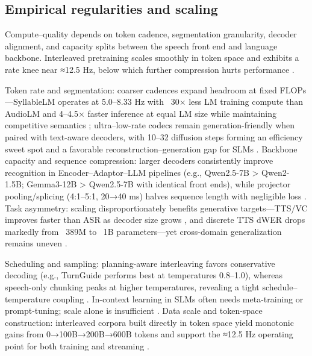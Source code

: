 \subsection{Empirical regularities and scaling} \label{subsec:Empirical regularities and scaling}
Compute–quality depends on token cadence, segmentation granularity, decoder alignment, and capacity splits between the speech front end and language backbone. Interleaved pretraining scales smoothly in token space and exhibits a rate knee near ≈12.5 Hz, below which further compression hurts performance \cite{zeng2024scalingspeechtextpretrainingsyntheticint}.

Token rate and segmentation: coarser cadences expand headroom at fixed FLOPs—SyllableLM operates at 5.0–8.33 Hz with ~30× less LM training compute than AudioLM and 4–4.5× faster inference at equal LM size while maintaining competitive semantics \cite{baade2024syllablelmlearningcoarsesemanticunitsspe}; ultra–low-rate codecs remain generation-friendly when paired with text-aware decoders, with 10–32 diffusion steps forming an efficiency sweet spot and a favorable reconstruction–generation gap for SLMs \cite{wang2025tadicodectextawarediffusionspeechtokeniz}. Backbone capacity and sequence compression: larger decoders consistently improve recognition in Encoder–Adaptor–LLM pipelines (e.g., Qwen2.5-7B > Qwen2-1.5B; Gemma3-12B > Qwen2.5-7B with identical front ends), while projector pooling/splicing (4:1–5:1, 20→40 ms) halves sequence length with negligible loss \cite{li2025transsionmultilingualspeechrecognitionsy,nguyen2025qwenvsgemmaintegrationwhispercomparative}. Task asymmetry: scaling disproportionately benefits generative targets—TTS/VC improves faster than ASR as decoder size grows \cite{wu2024speechcomposerunifyingmultiplespeechtask}, and discrete TTS dWER drops markedly from ~389M to ~1B parameters—yet cross-domain generalization remains uneven \cite{wang2024evaluatingtextspeechsynthesislargediscre,huang2025dynamicsuperbphase2collaborativelyexpand}.

Scheduling and sampling: planning-aware interleaving favors conservative decoding (e.g., TurnGuide performs best at temperatures 0.8–1.0), whereas speech-only chunking peaks at higher temperatures, revealing a tight schedule–temperature coupling \cite{cui2025thinkbeforeyoutalkenhancingmeaningfuldia}. In-context learning in SLMs often needs meta-training or prompt-tuning; scale alone is insufficient \cite{hsu2024exploringcontextlearningtextlessspeechla}. Data scale and token-space construction: interleaved corpora built directly in token space yield monotonic gains from 0→100B→200B→600B tokens and support the ≈12.5 Hz operating point for both training and streaming \cite{zeng2024scalingspeechtextpretrainingsyntheticint}.

